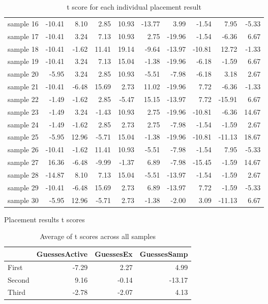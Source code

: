 \begin{table}
\begin{tabular}{lrrrrrrrrr}
sample 16 &        -10.41 &   8.10 &   2.85 &     10.93 & -13.77 &   3.99 &       -1.54 &   7.95 &  -5.33 \\
sample 17 &        -10.41 &   3.24 &   7.13 &     10.93 &   2.75 & -19.96 &       -1.54 &  -6.36 &   6.67 \\
sample 18 &        -10.41 &  -1.62 &  11.41 &     19.14 &  -9.64 & -13.97 &      -10.81 &  12.72 &  -1.33 \\
sample 19 &        -10.41 &   3.24 &   7.13 &     15.04 &  -1.38 & -19.96 &       -6.18 &  -1.59 &   6.67 \\
sample 20 &         -5.95 &   3.24 &   2.85 &     10.93 &  -5.51 &  -7.98 &       -6.18 &   3.18 &   2.67 \\
sample 21 &        -10.41 &  -6.48 &  15.69 &      2.73 &  11.02 & -19.96 &        7.72 &  -6.36 &  -1.33 \\
sample 22 &         -1.49 &  -1.62 &   2.85 &     -5.47 &  15.15 & -13.97 &        7.72 & -15.91 &   6.67 \\
sample 23 &         -1.49 &   3.24 &  -1.43 &     10.93 &   2.75 & -19.96 &      -10.81 &  -6.36 &  14.67 \\
sample 24 &         -1.49 &  -1.62 &   2.85 &      2.73 &   2.75 &  -7.98 &       -1.54 &  -1.59 &   2.67 \\
sample 25 &         -5.95 &  12.96 &  -5.71 &     15.04 &  -1.38 & -19.96 &      -10.81 & -11.13 &  18.67 \\
sample 26 &        -10.41 &  -1.62 &  11.41 &     10.93 &  -5.51 &  -7.98 &       -1.54 &   7.95 &  -5.33 \\
sample 27 &         16.36 &  -6.48 &  -9.99 &     -1.37 &   6.89 &  -7.98 &      -15.45 &  -1.59 &  14.67 \\
sample 28 &        -14.87 &   8.10 &   7.13 &     15.04 &  -5.51 & -13.97 &       -1.54 &  -1.59 &   2.67 \\
sample 29 &        -10.41 &  -6.48 &  15.69 &      2.73 &   6.89 & -13.97 &        7.72 &  -1.59 &  -5.33 \\
sample 30 &         -5.95 &  12.96 &  -5.71 &      2.73 &  -1.38 &  -2.00 &        3.09 & -11.13 &   6.67 \\
\bottomrule
\end{tabular}
\caption{Placement results t scores}
\caption*{t score for each individual placement result}
\end{table}



\begin{table}
\begin{tabular}{lrrr}
\toprule
{} &  GuessesActive &  GuessesEx &  GuessesSamp \\
\midrule
First  &      -7.29 &       2.27 &         4.99 \\
Second &       9.16 &      -0.14 &       -13.17 \\
Third  &      -2.78 &      -2.07 &         4.13 \\
\bottomrule
\end{tabular}
\caption{Average of t scores across all samples}
\end{table}
